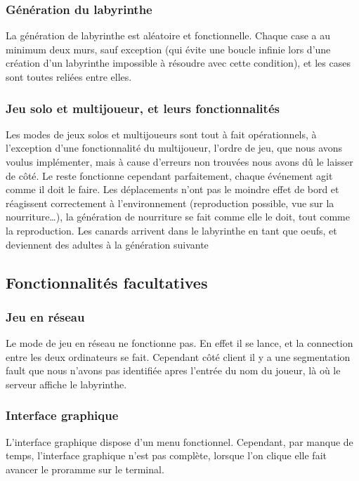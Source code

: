 \documentclass[12pt,a4paper,twoside]{article}
\begin{document}
\subsubsection{Génération du labyrinthe}
    La génération de labyrinthe est aléatoire et fonctionnelle. Chaque case a au minimum deux murs, sauf exception (qui évite une boucle infinie lors d’une création d’un labyrinthe impossible à résoudre avec cette condition), et les cases sont toutes reliées entre elles. 
\subsubsection{Jeu solo et multijoueur, et leurs fonctionnalités }
    Les modes de jeux solos et multijoueurs sont tout à fait opérationnels, à l’exception d’une fonctionnalité du multijoueur, l’ordre de jeu, que nous avons voulus implémenter, mais à cause d’erreurs non trouvées nous avons dû le laisser de côté. Le reste fonctionne cependant parfaitement, chaque événement agit comme il doit le faire. Les déplacements n’ont pas le moindre effet de bord et réagissent correctement à l'environnement (reproduction possible, vue sur la nourriture…), la génération de nourriture se fait comme elle le doit, tout comme la reproduction. Les canards arrivent dans le labyrinthe en tant que oeufs, et deviennent des adultes à la génération suivante
\subsection{Fonctionnalités facultatives}
\subsubsection{Jeu en réseau}
    Le mode de jeu en réseau ne fonctionne pas. En effet il se lance, et la connection entre les deux ordinateurs se fait. Cependant côté client il y a une segmentation fault que nous n'avons pas identifiée apres l'entrée du nom du joueur, là où le serveur affiche le labyrinthe.
\subsubsection{Interface graphique}
    L’interface graphique dispose d’un menu fonctionnel. Cependant, par manque de temps, l’interface graphique n’est pas complète, lorsque l'on clique elle fait avancer le proramme sur le terminal.
\end{document}
